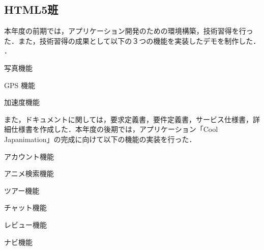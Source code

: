 \subsection{HTML5班}
\par 本年度の前期では，アプリケーション開発のための環境構築，技術習得を行った．また，技術習得の成果として以下の３つの機能を実装したデモを制作した．
．
\item 写真機能
\item GPS 機能
\item 加速度機能
\par また，ドキュメントに関しては，要求定義書，要件定義書，サービス仕様書，詳細仕様書を作成した．本年度の後期では，アプリケーション「Cool Japanimation」の完成に向けて以下の機能の実装を行った．
\item アカウント機能
\item アニメ検索機能 
\item ツアー機能
\item チャット機能
\item レビュー機能
\item ナビ機能

